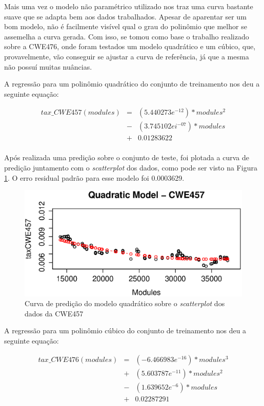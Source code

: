 Mais uma vez o modelo não paramétrico utilizado nos traz uma curva bastante
suave que se adapta bem aos dados trabalhados. Apesar de aparentar ser um bom
modelo, não é facilmente visível qual o grau do polinômio que melhor se
assemelha a curva gerada. Com isso, se tomou como base o trabalho realizado
sobre a CWE476, onde foram testados um modelo quadrático e um cúbico, que,
provavelmente, vão conseguir se ajustar a curva de referência, já que a mesma não
possuí muitas nuâncias.

A regressão para um polinômio quadrático do conjunto de treinamento nos deu a
seguinte equação:

\begin{align*}
 tax\_CWE457(modules) &=& (5.440273e^{-12}) * modules^{2} \\
                      &-& (3.745102ei^{-07}) * modules \\
                      &+& 0.01283622 \\
\end{align*}

Após realizada uma predição sobre o conjunto de teste, foi plotada a curva de
predição juntamento com o \textit{scatterplot} dos dados, como pode ser visto na
Figura \ref{fig:cwe457-quadratic}. O erro residual padrão para esse modelo foi
0.0003629.

\begin{figure}[h]
  \centering
  \includegraphics[width=1.0\textwidth]
      {figuras/cwe457-quadratic.eps}
      \caption{Curva de predição do modelo quadrático sobre o \textit{scatterplot}
      dos dados da CWE457}
  \label{fig:cwe457-quadratic}
\end{figure}

A regressão para um polinômio cúbico do conjunto de treinamento nos deu a
seguinte equação:

\begin{align*}
 tax\_CWE476(modules) &=& (-6.466983e^{-16}) * modules^{3} \\
                      &+& (5.603787e^{-11}) * modules^{2} \\
                      &-& (1.639652e^{-6}) * modules \\
                      &+& 0.02287291
\end{align*}

